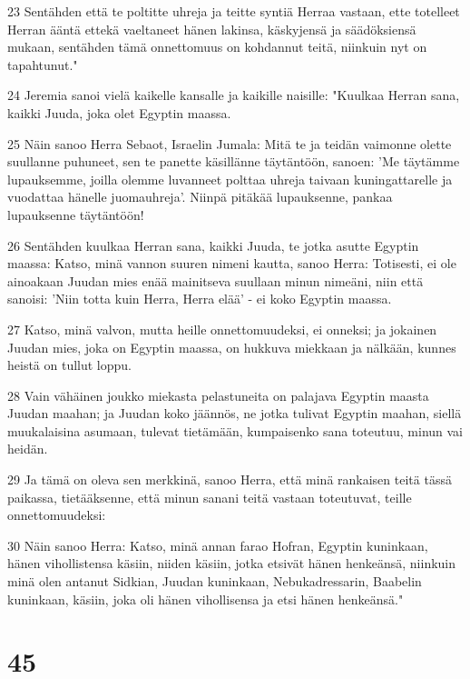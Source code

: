 \par 23 Sentähden että te poltitte uhreja ja teitte syntiä Herraa vastaan, ette totelleet Herran ääntä ettekä vaeltaneet hänen lakinsa, käskyjensä ja säädöksiensä mukaan, sentähden tämä onnettomuus on kohdannut teitä, niinkuin nyt on tapahtunut."
\par 24 Jeremia sanoi vielä kaikelle kansalle ja kaikille naisille: "Kuulkaa Herran sana, kaikki Juuda, joka olet Egyptin maassa.
\par 25 Näin sanoo Herra Sebaot, Israelin Jumala: Mitä te ja teidän vaimonne olette suullanne puhuneet, sen te panette käsillänne täytäntöön, sanoen: 'Me täytämme lupauksemme, joilla olemme luvanneet polttaa uhreja taivaan kuningattarelle ja vuodattaa hänelle juomauhreja'. Niinpä pitäkää lupauksenne, pankaa lupauksenne täytäntöön!
\par 26 Sentähden kuulkaa Herran sana, kaikki Juuda, te jotka asutte Egyptin maassa: Katso, minä vannon suuren nimeni kautta, sanoo Herra: Totisesti, ei ole ainoakaan Juudan mies enää mainitseva suullaan minun nimeäni, niin että sanoisi: 'Niin totta kuin Herra, Herra elää' - ei koko Egyptin maassa.
\par 27 Katso, minä valvon, mutta heille onnettomuudeksi, ei onneksi; ja jokainen Juudan mies, joka on Egyptin maassa, on hukkuva miekkaan ja nälkään, kunnes heistä on tullut loppu.
\par 28 Vain vähäinen joukko miekasta pelastuneita on palajava Egyptin maasta Juudan maahan; ja Juudan koko jäännös, ne jotka tulivat Egyptin maahan, siellä muukalaisina asumaan, tulevat tietämään, kumpaisenko sana toteutuu, minun vai heidän.
\par 29 Ja tämä on oleva sen merkkinä, sanoo Herra, että minä rankaisen teitä tässä paikassa, tietääksenne, että minun sanani teitä vastaan toteutuvat, teille onnettomuudeksi:
\par 30 Näin sanoo Herra: Katso, minä annan farao Hofran, Egyptin kuninkaan, hänen vihollistensa käsiin, niiden käsiin, jotka etsivät hänen henkeänsä, niinkuin minä olen antanut Sidkian, Juudan kuninkaan, Nebukadressarin, Baabelin kuninkaan, käsiin, joka oli hänen vihollisensa ja etsi hänen henkeänsä."

\chapter{45}

